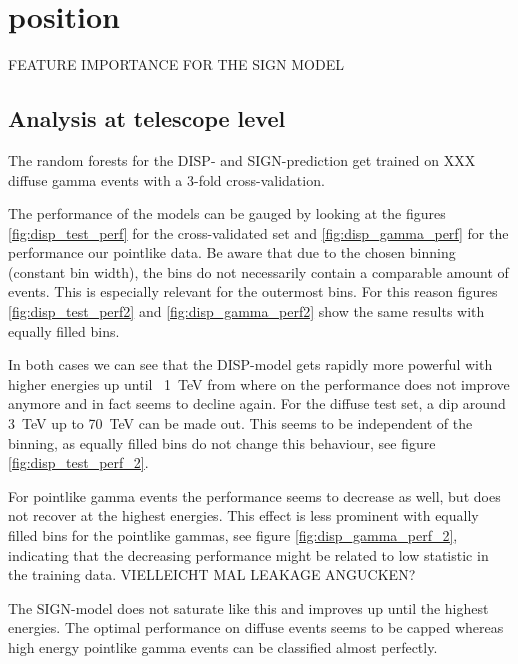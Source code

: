 \section{position}\label{position}

FEATURE IMPORTANCE FOR THE SIGN MODEL

\subsection{Analysis at telescope level}

The random forests for the DISP- and SIGN-prediction get trained on
XXX diffuse gamma events with a 3-fold cross-validation.

The performance of the models can be gauged by looking at the 
figures \ref{fig:disp_test_perf} for the cross-validated set and 
\ref{fig:disp_gamma_perf} for the performance our 
pointlike data. Be aware that due to the chosen binning (constant bin width),
the bins do not necessarily contain a comparable amount of events.
This is especially relevant for the outermost bins.
For this reason figures \ref{fig:disp_test_perf2} and \ref{fig:disp_gamma_perf2}
show the same results with equally filled bins.

In both cases we can see that the DISP-model gets rapidly more
powerful with higher energies up until ~\SI{1}{\tera\electronvolt} from 
where on the performance does not improve anymore and in fact seems to decline
again. For the diffuse test set, a dip around \SI{3}{\tera\electronvolt}
up to \SI{70}{\tera\electronvolt} can be made out.
This seems to be independent of the binning, as equally filled bins 
do not change this behaviour, see figure \ref{fig:disp_test_perf_2}.

For pointlike gamma events the performance seems to decrease as well, but does not 
recover at the highest energies.
This effect is less prominent with equally filled bins for the pointlike
gammas, see figure \ref{fig:disp_gamma_perf_2}, indicating that the decreasing 
performance might be related to low statistic in the training data.
VIELLEICHT MAL LEAKAGE ANGUCKEN?  

The SIGN-model does not saturate like this and improves up until the highest energies. 
The optimal performance on diffuse events seems 
to be capped whereas high energy pointlike gamma events can be classified almost perfectly.

